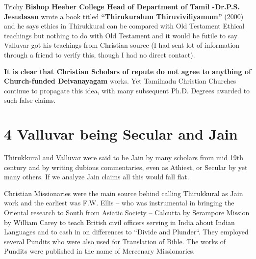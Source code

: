 Trichy \textbf{Bishop Heeber College Head of Department of Tamil -\break Dr.P.S. Jesudasan} wrote a book titled \textbf{“Thirukuralum Thiruvi\-viliyamum”} (2000) and he says ethics in Thirukkural can be compared with Old Testament Ethical teachings but nothing to do with Old Testament and it would be futile to say Valluvar got his teachings from Christian source (I had sent lot of information through a friend to verify this, though I had no direct contact).

\textbf{It is clear that Christian Scholars of repute do not agree to anything of Church-funded Deivanayagam} works. Yet Tamilnadu Christian Churches continue to propagate this idea, with many subsequent Ph.D. Degrees awarded to such false claims.


\section*{4 Valluvar being Secular and Jain}

Thirukkural and Valluvar were said to be Jain by many scholars from mid 19th century and by writing dubious commentaries, even as Athiest, or Secular by yet many others. If we analyze Jain claims all this would fall flat.

Christian Missionaries were the main source behind calling Thirukkural as Jain work and the earliest was F.W. Ellis – who was instrumental in bringing the Oriental research to South from Asiatic Society – Calcutta by Serampore Mission by William Carey to teach British civil officers serving in India about Indian Languages and to cash in on differences to “Divide and Plunder“. They employed several Pundits who were also used for Translation of Bible. The works of Pundits were published in the name of Mercenary Missionaries.

